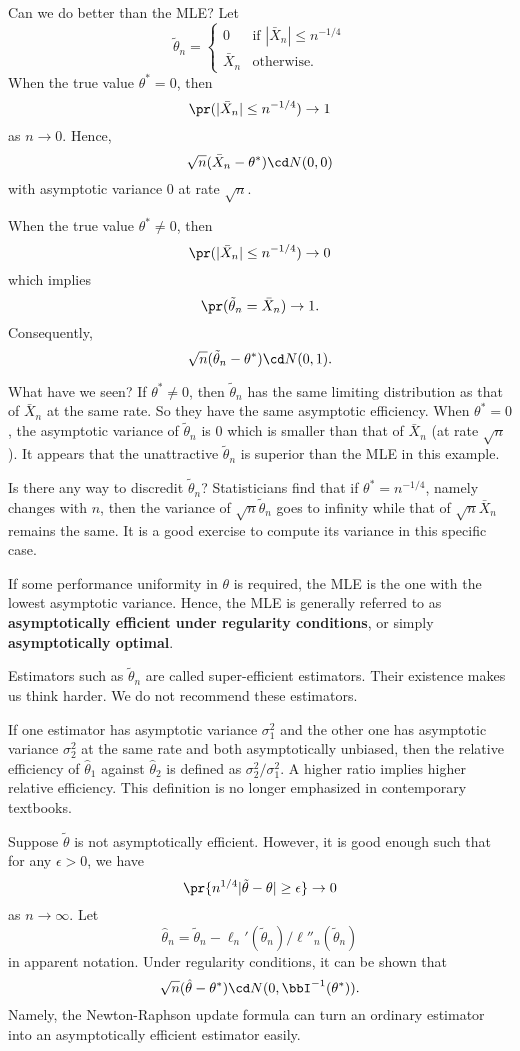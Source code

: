 Can we do better than the MLE? Let
\[
\tilde \theta_n =
\left \{
\begin{array}{ll}
0 & \mbox{if } |\bar X_n| \leq n^{-1/4}\\
\bar X_n & \mbox{otherwise.}
\end{array}
\right .
\]
When the true value $\theta^* = 0$, then
\[
\pr( |\bar X_n| \leq n^{-1/4}) \to 1
\]
as $n\to 0$. Hence,
\[
\sqrt{n}(\bar X_n - \theta^*) \cd N(0, 0)
\]
with asymptotic variance $0$ at rate $\sqrt{n}$.

When the true value $\theta^* \neq 0$, then
\[
\pr( |\bar X_n| \leq n^{-1/4}) \to 0
\]
which implies
\[
\pr( \tilde \theta_n = \bar X_n) \to 1.
\]
Consequently, 
\[
\sqrt{n}(\tilde \theta_n - \theta^*) \cd N(0, 1).
\]

What have we seen? If $\theta^* \neq 0$, then $\tilde \theta_n$
has the same limiting distribution as that of $\bar X_n$ at the
same rate. So they have the same asymptotic efficiency.
When $\theta^* = 0$, the asymptotic variance of $\tilde \theta_n$
is $0$ which is smaller than that of $\bar X_n$ (at rate $\sqrt{n}$).
It appears that the unattractive $\tilde \theta_n$ is superior than
the MLE in this example.

Is there any way to discredit $\tilde \theta_n$? Statisticians find
that if $\theta^* = n^{-1/4}$, namely changes with $n$, then
the variance of $\sqrt{n} \tilde \theta_n$ goes to infinity while that of
$\sqrt{n} \bar X_n$ remains the same. It is a good exercise to
compute its variance in this specific case.

If some performance uniformity in $\theta$ is required, 
the MLE is the one with the lowest asymptotic
variance. Hence, the MLE is generally referred to as {\bf asymptotically
efficient under regularity conditions}, or simply {\bf asymptotically optimal}.

Estimators such as $\tilde \theta_n$ are called super-efficient
estimators. Their existence makes us think harder. We do not
recommend these estimators.

If one estimator has asymptotic variance $\sigma_1^2$ and the
other one has asymptotic variance $\sigma_2^2$ at the same
rate and both asymptotically unbiased, then  the relative efficiency
of $\hat \theta_1$ against $\hat \theta_2$
is defined as $\sigma_2^2/\sigma_1^2$. A higher ratio implies
higher relative efficiency. This definition is no longer emphasized
in contemporary textbooks.

Suppose $\tilde \theta$ is not asymptotically efficient. However, it is
good enough such that for any $\epsilon > 0$, we have
\[
\pr \{ n^{1/4} |\tilde \theta - \theta| \geq \epsilon \} \to 0
\]
as $n \to \infty$. Let
\[
\hat \theta_n = \tilde \theta_n - \ell_n'(\tilde \theta_n )/\ell''_n( \tilde \theta_n )
\]
in apparent notation. Under regularity conditions, it can be shown that
\[
\sqrt{n} (\hat \theta - \theta^*)  \cd N(0, \bbI^{-1}(\theta^*)).
\]
Namely, the Newton-Raphson update formula can turn an
ordinary estimator into an asymptotically efficient estimator easily.

